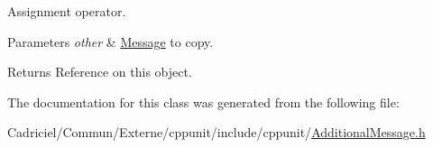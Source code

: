 Assignment operator. 


\begin{DoxyParams}{Parameters}
{\em other} & \hyperlink{class_message}{Message} to copy. \\
\hline
\end{DoxyParams}
\begin{DoxyReturn}{Returns}
Reference on this object. 
\end{DoxyReturn}


The documentation for this class was generated from the following file\-:\begin{DoxyCompactItemize}
\item 
Cadriciel/\-Commun/\-Externe/cppunit/include/cppunit/\hyperlink{_additional_message_8h}{Additional\-Message.\-h}\end{DoxyCompactItemize}
